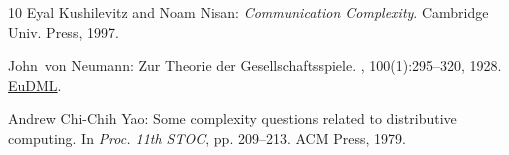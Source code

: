 \begin{thebibliography}{10}
{\sc Eyal Kushilevitz and Noam Nisan}: {\em Communication Complexity}.
\newblock Cambridge Univ. Press, 1997.

{\sc John~von Neumann}: {Zur Theorie der Gesellschaftsspiele}.
, 100(1):295--320, 1928.
\newblock \href{http://eudml.org/doc/159291}{EuDML}.

{\sc Andrew Chi-Chih Yao}: Some complexity questions related to distributive
  computing.
\newblock In {\em Proc. 11th STOC}, pp. 209--213. ACM Press, 1979.
\newblock [\epfmtdoi{10.1145/800135.804414}]

\end{thebibliography}